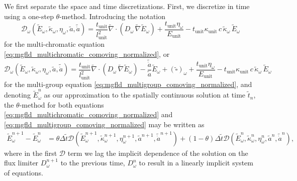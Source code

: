 \documentclass[10pt]{article}
\renewcommand{\(}{\left(}
\renewcommand{\)}{\right)}
\newcommand{\adot}{\dot{a}}
\newcommand{\mD}{{\mathcal D}}
\newcommand{\Lunit}{l_{\text{unit}}}
\newcommand{\Tunit}{t_{\text{unit}}}
\newcommand{\Eunit}{E_{\text{unit}}}
\newcommand{\Kunit}{\kappa_{\text{unit}}}
\newcommand{\tK}{\tilde{\kappa}}
\newcommand{\tT}{\tilde{t}}
\newcommand{\tE}{\tilde{E}}
\newcommand{\tA}{\tilde{a}}
\newcommand{\tAdot}{\tilde{\adot}}
\newcommand{\tnabla}{\tilde{\nabla}}
\begin{document}
We first separate the space and time discretizations.  First, we
discretize in time using a one-step $\theta$-method.  Introducing the
notation 
\[
   \mD_{\omega}(\tE_{\omega},\tK_{\omega},\eta_{\omega},\tA,\tAdot) = 
   \frac{\Tunit}{\Lunit^2}\tnabla\cdot\(D_{\omega}\,\tnabla \tE_{\omega}\)
    + \frac{\Tunit\eta_{\omega}}{\Eunit} 
    - \Tunit \Kunit\, c\, \tK_{\omega}\, \tE_{\omega}
\]
for the multi-chromatic equation
\eqref{eq:mgfld_multichromatic_comoving_normalized}, or 
\[
   \mD_{\omega}(\tE_{\omega},\tK_{\omega},\eta_{\omega},\tA,\tAdot) = 
   \frac{\Tunit}{\Lunit^2}\tnabla\cdot\(D_{\omega}\,\tnabla \tE_{\omega}\)
    - \frac{\tAdot}{\tA} \tE_{\omega} + (\tilde{\square})_{\omega}
    + \frac{\Tunit\eta_{\omega}}{\Eunit} 
    - \Tunit \Kunit\, c\, \tK_{\omega}\, \tE_{\omega}
\]
for the multi-group equation \eqref{eq:mgfld_multigroup_comoving_normalized},
and denoting $\tE_{\omega}^n$ as our approximation to the spatially continuous
solution at time $\tT_{n}$, the $\theta$-method for both equations
\eqref{eq:mgfld_multichromatic_comoving_normalized} and
\eqref{eq:mgfld_multigroup_comoving_normalized} may be written as
\begin{align}
  \label{eq:mgfld_theta}
  \tE_{\omega}^{n+1} - \tE_{\omega}^n &= 
    \theta\Delta \tT \mD(\tE_{\omega}^{n+1},\tK_{\omega}^{n+1},\eta_{\omega}^{n+1},\tA^{n+1},\tAdot^{n+1}) 
    + (1-\theta)\Delta \tT \mD(\tE_{\omega}^n,\tK_{\omega}^n,\eta_{\omega}^n,\tA^n,\tAdot^n),
\end{align}
where in the first $\mD$ term we lag the implicit dependence of the
solution on the flux limiter $D_{\omega}^{n+1}$ to the previous time, $D_{\omega}^n$ to
result in a linearly implicit system of equations.  
\end{document}
